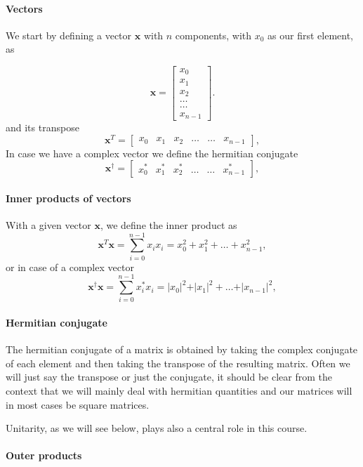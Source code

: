 \paragraph{Vectors}

We start by defining a vector $\bm{x}$  with $n$ components, with $x_0$ as our first element, as

\[
\bm{x} = \begin{bmatrix} x_0\\ x_1 \\ x_2 \\ \dots \\ \dots \\ x_{n-1} \end{bmatrix}.
\]
and its transpose 
\[
\bm{x}^{T} = \begin{bmatrix} x_0 & x_1 & x_2 & \dots & \dots & x_{n-1} \end{bmatrix},
\]
In case we have a complex vector we define the hermitian conjugate
\[
\bm{x}^{\dagger} = \begin{bmatrix} x_0^* & x_1^* & x_2^* & \dots & \dots & x_{n-1}^* \end{bmatrix},
\]


\paragraph{Inner products of vectors}

With a given vector $\bm{x}$, we define the inner product as
\[
\bm{x}^T \bm{x} = \sum_{i=0}^{n-1} x_ix_i=x_0^2+x_1^2+\dots + x_{n-1}^2,
\]
or in case of a complex vector
\[
\bm{x}^{\dagger} \bm{x} = \sum_{i=0}^{n-1} x_i^*x_i=\vert x_0\vert^2+\vert x_1\vert^2+\dots + \vert x_{n-1}\vert^2,
\]


\paragraph{Hermitian conjugate}

The hermitian conjugate of a matrix is obtained by taking the complex
conjugate of each element and then taking the transpose of the
resulting matrix. Often we will just say the transpose or just the
conjugate, it should be clear from the context that we will mainly
deal with hermitian quantities and our matrices will in most cases be square matrices.

Unitarity, as we will see below, plays also a central role in this course.


\paragraph{Outer products}

